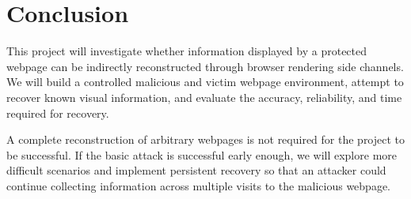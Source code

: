 \section{Conclusion}

This project will investigate whether information displayed by a protected webpage can be indirectly reconstructed through browser rendering side channels. We will build a controlled malicious and victim webpage environment, attempt to recover known visual information, and evaluate the accuracy, reliability, and time required for recovery.

A complete reconstruction of arbitrary webpages is not required for the project to be successful. If the basic attack is successful early enough, we will explore more difficult scenarios and implement persistent recovery so that an attacker could continue collecting information across multiple visits to the malicious webpage.